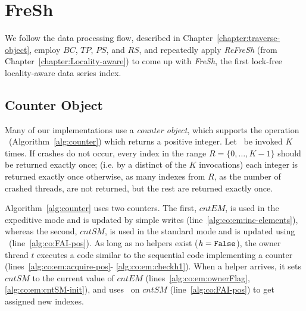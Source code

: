 \chapter{FreSh}
\label{chapter:FreSh}

We follow the data processing flow, described in Chapter~\ref{chapter:traverse-object},
employ $\mathit{BC}$, $\mathit{TP}$, $\mathit{PS}$, and $\mathit{RS}$,
and repeatedly apply \textit{ReFreSh} (from Chapter~\ref{chapter:Locality-aware}) to come up with
\textit{FreSh}, the first lock-free locality-aware data series index.

\section{Counter Object}

Many of our implementations use a {\em counter object}, which supports the
operation \NextIndex\ (Algorithm~\ref{alg:counter}) which returns a positive integer. 
Let \NextIndex\ be invoked $K$ times.
If crashes do not occur, every index in the range $R = 
\{0, \ldots, K-1\}$ should be returned exactly once; 
(i.e. by a distinct of the $K$ invocations) each integer 
is returned exactly once otherwise, as many indexes from $R$,
as the number of crashed  threads, 
are not returned, but the rest are returned exactly once.

Algorithm~\ref{alg:counter} uses two counters. The first, $\mathit{cntEM}$,
is used in the expeditive mode and is updated by simple writes
(line~\ref{alg:co:em:inc-elements}),
whereas the second, $\mathit{cntSM}$, is used in the standard mode and
is updated using \FAI\ (line~\ref{alg:co:FAI-pos}).
As long as no helpers exist ($\mathit{h = \mbox{\texttt{False}}}$), the owner thread $t$ executes 
a code similar to the sequential code implementing a counter (lines~\ref{alg:co:em:acquire-pos}-
\ref{alg:co:em:checkh1}). When a helper arrives, it sets $\mathit{cntSM}$ to the current
value of $cntEM$ (lines~\ref{alg:co:em:ownerFlag}, \ref{alg:co:em:cntSM-init}),
and uses \FAI\ on $\mathit{cntSM}$ (line~\ref{alg:co:FAI-pos}) to get assigned new indexes. 

